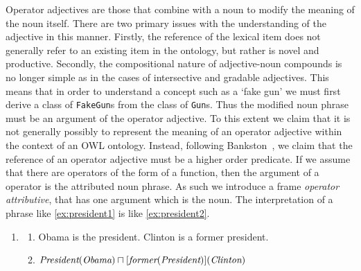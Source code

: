 \documentclass[11pt]{article}
\begin{document}
Operator adjectives are those that combine with a noun to modify the meaning of the noun itself. 
There are two primary issues with the understanding of the adjective in this manner. 
Firstly, the reference of the lexical item does not generally refer to an existing item 
in the ontology, but rather is novel and productive. Secondly, the compositional nature 
of adjective-noun compounds is no longer simple as in the cases of intersective and gradable adjectives.
This means that in order to understand a concept such as a `fake gun' we must first
derive a class of {\tt FakeGun}s from the class of {\tt Gun}s. Thus the modified noun phrase
must be an argument of the operator adjective.
To this extent we claim that it is not generally possibly to represent the 
meaning of an operator adjective within the context of an OWL ontology.
Instead, following Bankston~\cite{bankston2003modeling}, we claim that
the reference of an operator adjective must be a higher order predicate.
If we assume that there are operators of the form of a function, then
the argument of a operator is the attributed noun phrase. As such
we introduce a frame \emph{operator attributive}, that has one argument
which is the noun. The interpretation of a phrase like \ref{ex:president1} is like \ref{ex:president2}.

\begin{enumerate}
\item \begin{enumerate}
\item Obama is the president. Clinton is a former president. \label{ex:president1}
\item $\text{\em President}(\text{\em Obama}) \sqcap [\text{\em former}(\text{\em President})](\text{\em Clinton})$ \label{ex:president2}
\end{enumerate}
\end{enumerate}
\end{document}
